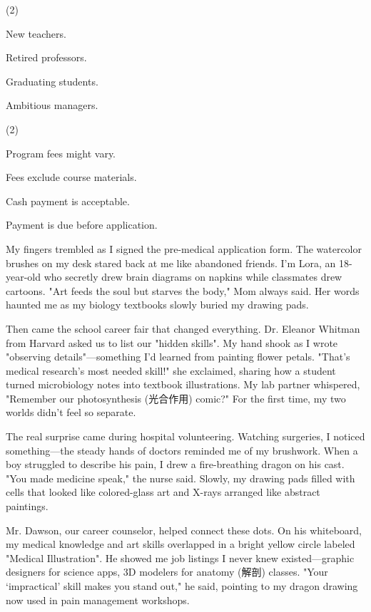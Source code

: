 \documentclass{英语试卷}
\begin{document}
\begin{choices}(2)
  \item New teachers.
  \item Retired professors.
  \item Graduating students.
  \item Ambitious managers.
\end{choices}
\begin{choices}(2)
  \item Program fees might vary.
  \item Fees exclude course materials.
  \item Cash payment is acceptable.
  \item Payment is due before application.
\end{choices}
\par My fingers trembled as I signed the pre-medical application form. The watercolor brushes on my desk stared back at me like abandoned friends. I'm Lora, an 18-year-old who secretly drew brain diagrams on napkins while classmates drew cartoons. "Art feeds the soul but starves the body," Mom always said. Her words haunted me as my biology textbooks slowly buried my drawing pads.\par
\par Then came the school career fair that changed everything. Dr. Eleanor Whitman from Harvard asked us to list our "hidden skills". My hand shook as I wrote "observing details"—something I’d learned from painting flower petals. "That’s medical research’s most needed skill!" she exclaimed, sharing how a student turned microbiology notes into textbook illustrations. My lab partner whispered, "Remember our photosynthesis (光合作用) comic?" For the first time, my two worlds didn't feel so separate.\par
\par The real surprise came during hospital volunteering. Watching surgeries, I noticed something—the steady hands of doctors reminded me of my brushwork. When a boy struggled to describe his pain, I drew a fire-breathing dragon on his cast. "You made medicine speak," the nurse said. Slowly, my drawing pads filled with cells that looked like colored-glass art and X-rays arranged like abstract paintings.\par
\par Mr. Dawson, our career counselor, helped connect these dots. On his whiteboard, my medical knowledge and art skills overlapped in a bright yellow circle labeled "Medical Illustration". He showed me job listings I never knew existed—graphic designers for science apps, 3D modelers for anatomy (解剖) classes. "Your ‘impractical’ skill makes you stand out," he said, pointing to my dragon drawing now used in pain management workshops.\par
\end{document}
